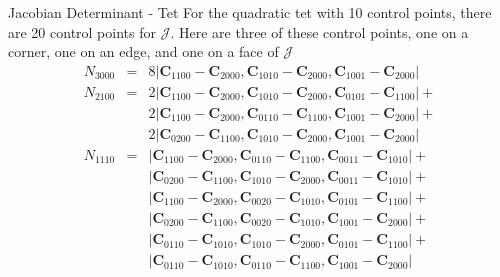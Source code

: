 \documentclass[12pt]{beamer}
\begin{document}
\begin{frame}{Jacobian Determinant - Tet}
For the quadratic tet with 10 control points, there are 20 control points for $\mathcal{J}$. Here are three of these control points, one on a corner, one on an edge, and one on a face of $\mathcal{J}$
\begin{eqnarray*}
N_{3000}&=&8\left|\mathbf{C}_{1100}-\mathbf{C}_{2000},\mathbf{C}_{1010}-\mathbf{C}_{2000},\mathbf{C}_{1001}-\mathbf{C}_{2000}\right|
\\N_{2100}&=&2\left|\mathbf{C}_{1100}-\mathbf{C}_{2000},\mathbf{C}_{1010}-\mathbf{C}_{2000},\mathbf{C}_{0101}-\mathbf{C}_{1100}\right|+\\&&2\left|\mathbf{C}_{1100}-\mathbf{C}_{2000},\mathbf{C}_{0110}-\mathbf{C}_{1100},\mathbf{C}_{1001}-\mathbf{C}_{2000}\right|+\\&&2\left|\mathbf{C}_{0200}-\mathbf{C}_{1100},\mathbf{C}_{1010}-\mathbf{C}_{2000},\mathbf{C}_{1001}-\mathbf{C}_{2000}\right|
\\N_{1110}&=&\left|\mathbf{C}_{1100}-\mathbf{C}_{2000},\mathbf{C}_{0110}-\mathbf{C}_{1100},\mathbf{C}_{0011}-\mathbf{C}_{1010}\right|+\\&&\left|\mathbf{C}_{0200}-\mathbf{C}_{1100},\mathbf{C}_{1010}-\mathbf{C}_{2000},\mathbf{C}_{0011}-\mathbf{C}_{1010}\right|+\\&&\left|\mathbf{C}_{1100}-\mathbf{C}_{2000},\mathbf{C}_{0020}-\mathbf{C}_{1010},\mathbf{C}_{0101}-\mathbf{C}_{1100}\right|+\\&&\left|\mathbf{C}_{0200}-\mathbf{C}_{1100},\mathbf{C}_{0020}-\mathbf{C}_{1010},\mathbf{C}_{1001}-\mathbf{C}_{2000}\right|+\\&&\left|\mathbf{C}_{0110}-\mathbf{C}_{1010},\mathbf{C}_{1010}-\mathbf{C}_{2000},\mathbf{C}_{0101}-\mathbf{C}_{1100}\right|+\\&&\left|\mathbf{C}_{0110}-\mathbf{C}_{1010},\mathbf{C}_{0110}-\mathbf{C}_{1100},\mathbf{C}_{1001}-\mathbf{C}_{2000}\right|
\end{eqnarray*}

\end{frame}
\end{document}
